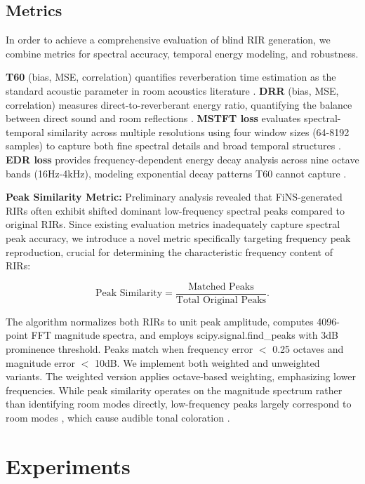 \documentclass[conference]{IEEEtran}
\begin{document}
 
\subsection{Metrics}

In order to achieve a comprehensive evaluation of blind RIR generation, we combine metrics for spectral accuracy, temporal energy modeling, and robustness.

\textbf{T60} (bias, MSE, correlation) quantifies reverberation time estimation as the standard acoustic parameter in room acoustics literature \cite{kuttruff2016room}. \textbf{DRR} (bias, MSE, correlation) measures direct-to-reverberant energy ratio, quantifying the balance between direct sound and room reflections \cite{naylor2010speech}. \textbf{MSTFT loss} evaluates spectral-temporal similarity across multiple resolutions using four window sizes (64-8192 samples) to capture both fine spectral details and broad temporal structures \cite{steinmetz2021filtered}. \textbf{EDR loss} provides frequency-dependent energy decay analysis across nine octave bands (16Hz-4kHz), modeling exponential decay patterns T60 cannot capture \cite{ratnarajah2023towards}. 
 
 
\textbf{Peak Similarity Metric:} Preliminary analysis revealed that FiNS-generated RIRs often exhibit shifted dominant low-frequency spectral peaks compared to original RIRs. Since existing evaluation metrics inadequately capture spectral peak accuracy, we introduce a novel metric specifically targeting frequency peak reproduction, crucial for determining the characteristic frequency content of RIRs:
 
\begin{equation}
\text{Peak Similarity} = \frac{\text{Matched Peaks}}{\text{Total Original Peaks}}.
\end{equation}
 
The algorithm normalizes both RIRs to unit peak amplitude, computes 4096-point FFT magnitude spectra, and employs scipy.signal.find\_peaks with 3dB prominence threshold. Peaks match when frequency error $<$ 0.25 octaves and magnitude error $<$ 10dB. We implement both weighted and unweighted variants. The weighted version applies octave-based weighting, emphasizing lower frequencies. While peak similarity operates on the magnitude spectrum rather than identifying room modes directly, low-frequency peaks largely correspond to room modes \cite{kuttruff2016room}, which cause audible tonal coloration \cite{fazenda2015}.
 
 
\section{Experiments} 
\end{document}
